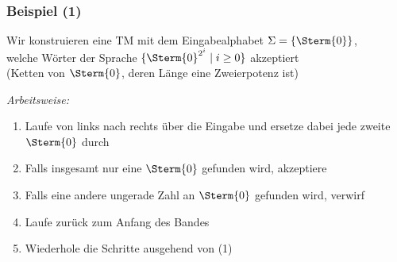 \documentclass[aspectratio=1610,onlymath]{beamer}
\begin{document}
\begin{frame}\frametitle{Beispiel (1)}

Wir konstruieren eine TM mit dem Eingabealphabet $\Sigma=\{\Sterm{0}\}$,\\ welche
Wörter der Sprache $\{\Sterm{0}^{2^i}\mid i\geq 0\}$ akzeptiert\\
(Ketten von $\Sterm{0}$, deren Länge eine Zweierpotenz ist)
\pause\bigskip

\emph{Arbeitsweise:}
\begin{enumerate}[(1)]
\item Laufe von links nach rechts über die Eingabe und ersetze dabei jede zweite $\Sterm{0}$ durch
\item Falls insgesamt nur eine $\Sterm{0}$ gefunden wird, akzeptiere
\item Falls eine andere ungerade Zahl an $\Sterm{0}$ gefunden wird, verwirf
\item Laufe zurück zum Anfang des Bandes
\item Wiederhole die Schritte ausgehend von (1)
\end{enumerate}

\end{frame}
\end{document}
